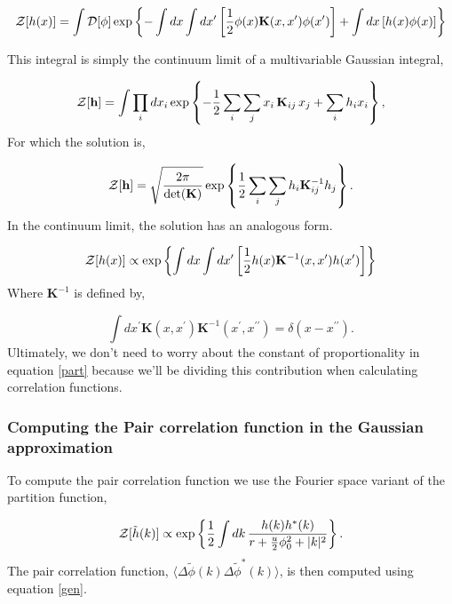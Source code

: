 \begin{equation}
\mathcal{Z}[h(x)] = \int \mathcal{D}[\phi] \exp\left\lbrace - \int dx \int dx^\prime \left[ \frac{1}{2}\phi(x) \mathbf{K}(x, x^\prime) \phi(x^\prime)\right] +  \int dx \left[h(x) \phi(x)\right]\right\rbrace
\end{equation}

This integral is simply the continuum limit of a multivariable Gaussian integral,

\begin{equation}
\mathcal{Z}[\mathbf{h}] = \int \prod_i dx_i \exp \left\lbrace - \frac{1}{2}\sum_i \sum_j x_i\, \mathbf{K}_{ij}\, x_j  + \sum_i h_i x_i\right\rbrace,
\end{equation}
For which the solution is,

\begin{equation}
\mathcal{Z}[\mathbf{h}] = \sqrt{\frac{2\pi}{\det(\mathbf{K})}} \exp\left\lbrace \frac{1}{2} \sum_i \sum_j h_i \mathbf{K}_{ij}^{-1} h_j\right\rbrace.
\end{equation}
In the continuum limit, the solution has an analogous form.

\begin{equation}\label{part}
\mathcal{Z}[h(x)] \propto \exp\left\lbrace \int dx \int dx^\prime \left[ \frac{1}{2}h(x) \mathbf{K}^{-1}(x, x^\prime) h(x^\prime)\right] \right\rbrace
\end{equation}
Where $\mathbf{K}^{-1}$ is defined by,

\begin{equation}
\int dx^\prime \mathbf{K}(x, x^\prime)\mathbf{K}^{-1}(x^\prime, x^{\prime\prime}) = \delta(x - x^{\prime\prime}).
\end{equation}
Ultimately, we don't need to worry about the constant of proportionality in equation \ref{part} because we'll be dividing this contribution when calculating correlation functions.

\subsubsection{Computing the Pair correlation function in the Gaussian approximation}

To compute the pair correlation function we use the Fourier space variant of the partition function,

\begin{equation}
\mathcal{Z}[\tilde{h}(k)] \propto \exp\left\lbrace \frac{1}{2}\int dk\,\frac{h(k)h^{*}(k)}{r + \frac{u}{2}\phi_0^2 +  \vert k \vert^2}\right\rbrace.
\end{equation}
The pair correlation function, $\langle \Delta\tilde{\phi}(k)\Delta\tilde{\phi}^{*}(k)\rangle$, is then computed using equation \ref{gen}.

